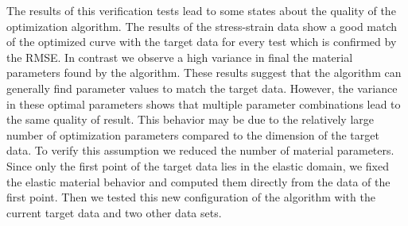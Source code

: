     The results of this verification tests lead to some states about the quality of the optimization algorithm. The results of the stress-strain data show a good match of the optimized curve with the target data for every test which is confirmed by the RMSE. In contrast we observe a high variance in final the material parameters found by the algorithm. These results suggest that the algorithm can generally find parameter values to match the target data. However, the variance in these optimal parameters shows that multiple parameter combinations lead to the same quality of result. This behavior may be due to the relatively large number of optimization parameters compared to the dimension of the target data. To verify this assumption we reduced the number of material parameters. Since only the first point of the target data lies in the elastic domain, we fixed the elastic material behavior and computed them directly from the data of the first point. Then we tested this new configuration of the algorithm with the current target data and two other data sets.



